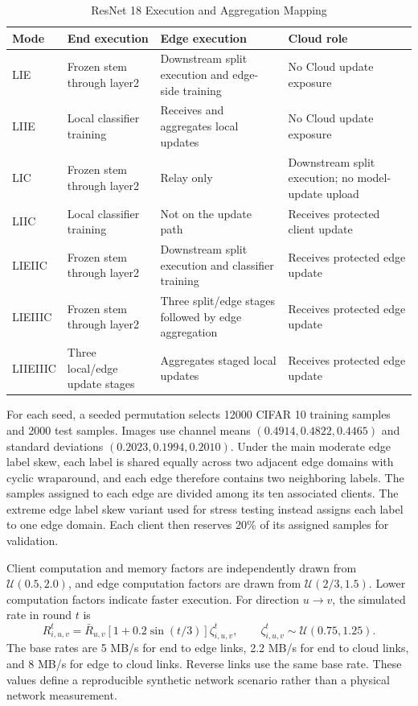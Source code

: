 \documentclass[5p,times]{elsarticle}
\theoremstyle{plain}
\theoremstyle{definition}
\theoremstyle{remark}
\begin{document}
\begin{table}[t]
\centering
\caption{ResNet 18 Execution and Aggregation Mapping}
\label{tab:resnet_mode_mapping}
\small
\setlength{\tabcolsep}{4pt}
\begin{tabularx}{\textwidth}{@{}lXXX@{}}
\hline
\textbf{Mode} & \textbf{End execution} & \textbf{Edge execution} & \textbf{Cloud role} \\
\hline
LIE & Frozen stem through layer2 & Downstream split execution and edge-side training & No Cloud update exposure \\
LIIE & Local classifier training & Receives and aggregates local updates & No Cloud update exposure \\
LIC & Frozen stem through layer2 & Relay only & Downstream split execution; no model-update upload \\
LIIC & Local classifier training & Not on the update path & Receives protected client update \\
LIEIIC & Frozen stem through layer2 & Downstream split execution and classifier training & Receives protected edge update \\
LIEIIIC & Frozen stem through layer2 & Three split/edge stages followed by edge aggregation & Receives protected edge update \\
LIIEIIIC & Three local/edge update stages & Aggregates staged local updates & Receives protected edge update \\
\hline
\end{tabularx}
\end{table}

For each seed, a seeded permutation selects 12000 CIFAR 10 training samples
and 2000 test samples. Images use channel means
$(0.4914,0.4822,0.4465)$ and standard deviations
$(0.2023,0.1994,0.2010)$. Under the main moderate edge label skew, each label
is shared equally across two adjacent edge domains with cyclic wraparound, and
each edge therefore contains two neighboring labels. The samples assigned to
each edge are divided among its ten associated clients. The extreme edge label
skew variant used for stress testing instead assigns each label to one edge
domain. Each client then reserves 20\% of its assigned samples for validation.

Client computation and memory factors are independently drawn from
$\mathcal U(0.5,2.0)$, and edge computation factors are drawn from
$\mathcal U(2/3,1.5)$. Lower computation factors indicate faster execution.
For direction $u\rightarrow v$, the simulated rate in round $t$ is
\begin{equation}
R_{i,u,v}^{t}=\bar R_{u,v}[1+0.2\sin(t/3)]\zeta_{i,u,v}^{t},
\qquad \zeta_{i,u,v}^{t}\sim\mathcal U(0.75,1.25).
\label{eq:experiment_link_rate}
\end{equation}
The base rates are 5 MB/s for end to edge links, 2.2 MB/s for end to cloud
links, and 8 MB/s for edge to cloud links. Reverse links use the same base
rate. These values define a reproducible synthetic network scenario rather
than a physical network measurement.
\end{document}
